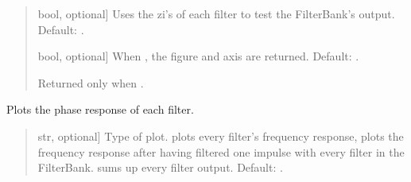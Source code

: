 \documentclass[letterpaper,10pt,english]{sphinxmanual}
\begin{document}
\begin{fulllineitems}
\begin{fulllineitems}
\begin{quote}
\begin{description}
\begin{description}
\sphinxlineitem{\sphinxstylestrong{test\_zi}}{[}bool, optional{]}
\sphinxAtStartPar
Uses the zi’s of each filter to test the FilterBank’s output.
Default: .

\sphinxlineitem{\sphinxstylestrong{returns}}{[}bool, optional{]}
\sphinxAtStartPar
When , the figure and axis are returned. Default: .

\end{description}

\begin{description}
\sphinxAtStartPar
Returned only when .

\end{description}

\end{description}\end{quote}

\end{fulllineitems}


\begin{fulllineitems}
\label{\detokenize{classes:dsptoolbox.classes.filterbank.FilterBank.plot_phase}}
\pysigstartsignatures
{}
\pysigstopsignatures
\sphinxAtStartPar
Plots the phase response of each filter.
\begin{quote}\begin{description}
\begin{description}
\sphinxlineitem{\sphinxstylestrong{mode}}{[}str, optional{]}
\sphinxAtStartPar
Type of plot.  plots every filter’s frequency response,
 plots the frequency response after having filtered
one impulse with every filter in the FilterBank. 
sums up every filter output. Default: .


\end{description}
\end{description}
\end{quote}
\end{fulllineitems}
\end{fulllineitems}
\end{document}
